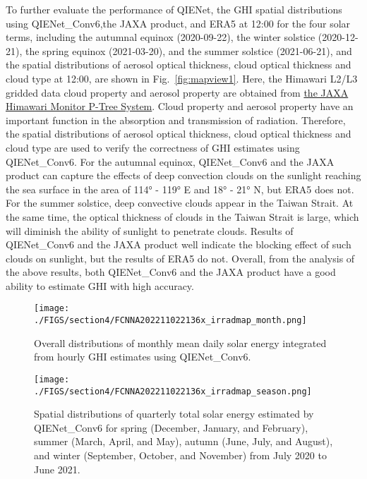\documentclass[review]{elsarticle}
\begin{document}
To further evaluate the performance of QIENet, the GHI spatial distributions using QIENet\_Conv6,the JAXA product, and ERA5 at 12:00 for the four solar terms, including the autumnal equinox (2020-09-22), the winter solstice (2020-12-21), the spring equinox (2021-03-20), and the summer solstice (2021-06-21), and the spatial distributions of aerosol optical thickness, cloud optical thickness and cloud type at 12:00, are shown in Fig.~\ref{fig:mapview1}.
Here, the Himawari L2/L3 gridded data cloud property and aerosol property are obtained from \href{https://www.eorc.jaxa.jp/ptree/index.html}{the JAXA Himawari Monitor P-Tree System}.
Cloud property and aerosol property have an important function in the absorption and transmission of radiation.
Therefore, the spatial distributions of aerosol optical thickness, cloud optical thickness and cloud type are used to verify the correctness of GHI estimates using QIENet\_Conv6.
For the autumnal equinox, QIENet\_Conv6 and the JAXA product can capture the effects of deep convection clouds on the sunlight reaching the sea surface in the area of 114° - 119° E and 18° - 21° N, but ERA5 does not.
For the summer solstice, deep convective clouds appear in the Taiwan Strait.
At the same time, the optical thickness of clouds in the Taiwan Strait is large, which will diminish the ability of sunlight to penetrate clouds.
Results of QIENet\_Conv6 and the JAXA product well indicate the blocking effect of such clouds on sunlight, but the results of ERA5 do not.
Overall, from the analysis of the above results, both QIENet\_Conv6 and the JAXA product have a good ability to estimate GHI with high accuracy.

\begin{figure}[!htbp]
    \centering
    \texttt{[image: ./FIGS/section4/FCNNA202211022136x\_irradmap\_month.png]}
    \caption{Overall distributions of monthly mean daily solar energy integrated from hourly GHI estimates using QIENet\_Conv6.}
    \label{fig:irrad_map_month}
\end{figure}

\begin{figure}[!htbp]
    \vskip-0pt
    \vspace{-5mm}
    \centering
    \texttt{[image: ./FIGS/section4/FCNNA202211022136x\_irradmap\_season.png]}
    \caption{Spatial distributions of quarterly total solar energy estimated by QIENet\_Conv6 for spring (December, January, and February), summer (March, April, and May), autumn (June, July, and August), and winter (September, October, and November) from July 2020 to June 2021.}
    \label{fig:irrad_map_season}
\end{figure}
\end{document}

